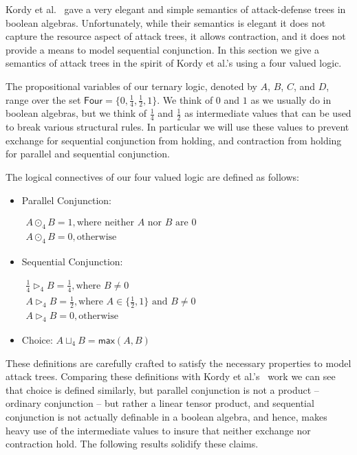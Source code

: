 \newcommand{\forth}{\frac{1}{4}}
\newcommand{\half}{\frac{1}{2}}

Kordy et al.~\cite{Kordy:2012} gave a very elegant and simple
semantics of attack-defense trees in boolean algebras.  Unfortunately,
while their semantics is elegant it does not capture the resource
aspect of attack trees, it allows contraction, and it does not provide
a means to model sequential conjunction.  In this section we give a
semantics of attack trees in the spirit of Kordy et al.'s using a four
valued logic.

The propositional variables of our ternary logic, denoted by $A$, $B$,
$C$, and $D$, range over the set $\mathsf{Four} = \{0, \forth, \half,
1\}$.  We think of $0$ and $1$ as we usually do in boolean algebras,
but we think of $\forth$ and $\half$ as intermediate values that can
be used to break various structural rules.  In particular we will use
these values to prevent exchange for sequential conjunction from
holding, and contraction from holding for parallel and sequential
conjunction.
\begin{definition}
  \label{def:logical-connectives}
  The logical connectives of our four valued logic are defined as
  follows:
  \begin{itemize}
  \item[] Parallel Conjunction:
    \begin{center}
      \begin{math}
        \begin{array}{lll}
          A \odot_4 B = 1, \text{where neither $A$ nor $B$ are $0$}\\
          A \odot_4 B = 0, \text{otherwise}
        \end{array}
      \end{math}
    \end{center}
  \item[] Sequential Conjunction:
    \begin{center}
      \begin{math}
        \begin{array}{lll}
          \forth \rhd_4 B = \forth, \text{where $B \neq 0$}\\[2px]         
          A \rhd_4 B = \half, \text{where } A \in \{\half, 1\} \text{ and } B \neq 0\\
          A \rhd_4 B = 0, \text{otherwise}
        \end{array}
      \end{math}
    \end{center}
  \item[] Choice: $A \sqcup_4 B = \mathsf{max}(A,B)$    
  \end{itemize}
\end{definition}
These definitions are carefully crafted to satisfy the necessary
properties to model attack trees.  Comparing these definitions with
Kordy et al.'s~\cite{Kordy:2012} work we can see that choice is
defined similarly, but parallel conjunction is not a product --
ordinary conjunction -- but rather a linear tensor product, and
sequential conjunction is not actually definable in a boolean algebra,
and hence, makes heavy use of the intermediate values to insure that
neither exchange nor contraction hold.  The following results solidify
these claims.

